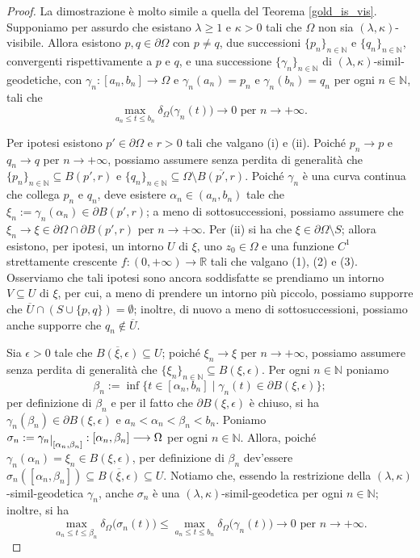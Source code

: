 \begin{proof}
    La dimostrazione è molto simile a quella del Teorema \ref{gold_is_vis}. Supponiamo per assurdo che esistano $\lambda \ge 1$ e $\kappa>0$ tali che $\Omega$ non sia $(\lambda,\kappa)$-visibile. Allora esistono $p,q\in\partial\Omega$ con $p\not=q$, due successioni $\{p_n\}_{n\in\mathbb{N}}$ e $\{q_n\}_{n\in\mathbb{N}}$, convergenti rispettivamente a $p$ e $q$, e una successione $\{\gamma_n\}_{n\in\mathbb{N}}$ di $(\lambda,\kappa)$-simil-geodetiche, con $\gamma_n:[a_n,b_n]\longrightarrow\Omega$ e $\gamma_n(a_n)=p_n$ e $\gamma_n(b_n)=q_n$ per ogni $n\in\mathbb{N}$, tali che
    $$\max_{a_n\le t\le b_n}\delta_\Omega\big(\gamma_n(t)\big)\longrightarrow 0\text{ per }n\longrightarrow+\infty.$$

    Per ipotesi esistono $p'\in\partial\Omega$ e $r>0$ tali che valgano (i) e (ii). Poiché $p_n\longrightarrow p$ e $q_n\longrightarrow q$ per $n\longrightarrow+\infty$, possiamo assumere senza perdita di generalità che $\{p_n\}_{n\in\mathbb{N}}\subseteq B(p',r)$ e $\{q_n\}_{n\in\mathbb{N}}\subseteq \Omega\setminus\overline{B(p',r)}$. Poiché $\gamma_n$ è una curva continua che collega $p_n$ e $q_n$, deve esistere $\alpha_n\in(a_n,b_n)$ tale che $\xi_n:=\gamma_n(\alpha_n)\in\partial B(p',r)$; a meno di sottosuccessioni, possiamo assumere che $\xi_n\longrightarrow\xi\in\partial\Omega\cap\partial B(p',r)$ per $n\longrightarrow+\infty$. Per (ii) si ha che $\xi\in\partial\Omega\setminus S$; allora esistono, per ipotesi, un intorno $U$ di $\xi$, uno $z_0\in\Omega$ e una funzione $C^1$ strettamente crescente $f:(0,+\infty)\longrightarrow\mathbb{R}$ tali che valgano (1), (2) e (3). Osserviamo che tali ipotesi sono ancora soddisfatte se prendiamo un intorno $V \subseteq U$ di $\xi$, per cui, a meno di prendere un intorno più piccolo, possiamo supporre che $\overline{U}\cap(S\cup\{p,q\})=\emptyset$; inoltre, di nuovo a meno di sottosuccessioni, possiamo anche supporre che $q_n\not\in\overline{U}$.

    Sia $\epsilon>0$ tale che $\overline{B(\xi,\epsilon)}\subseteq U$; poiché $\xi_n\longrightarrow \xi$ per $n\longrightarrow+\infty$, possiamo assumere senza perdita di generalità che $\{\xi_n\}_{n\in\mathbb{N}}\subseteq B(\xi,\epsilon)$. Per ogni $n\in\mathbb{N}$ poniamo
    $$\beta_n:=\inf\{t\in[\alpha_n,b_n]\mid \gamma_n(t)\in\partial B(\xi,\epsilon)\};$$
    per definizione di $\beta_n$ e per il fatto che $\partial B(\xi,\epsilon)$ è chiuso, si ha $\gamma_n(\beta_n)\in\partial B(\xi,\epsilon)$ e $a_n<\alpha_n<\beta_n<b_n$. Poniamo $\sigma_n:=\gamma_n\restrict{[\alpha_n,\beta_n]}:[\alpha_n,\beta_n]\longrightarrow\Omega$ per ogni $n\in\mathbb{N}$. Allora, poiché $\gamma_n(\alpha_n)=\xi_n\in B(\xi,\epsilon)$, per definizione di $\beta_n$ dev'essere $\sigma_n([\alpha_n,\beta_n])\subseteq\overline{B(\xi,\epsilon)}\subseteq U$. Notiamo che, essendo la restrizione della $(\lambda,\kappa)$-simil-geodetica $\gamma_n$, anche $\sigma_n$ è una $(\lambda,\kappa)$-simil-geodetica per ogni $n\in\mathbb{N}$; inoltre, si ha
    $$\max_{\alpha_n\le t\le \beta_n}\delta_\Omega\big(\sigma_n(t)\big)\le\max_{a_n\le t\le b_n}\delta_\Omega\big(\gamma_n(t)\big)\longrightarrow 0\text{ per }n\longrightarrow+\infty.$$


\end{proof}
